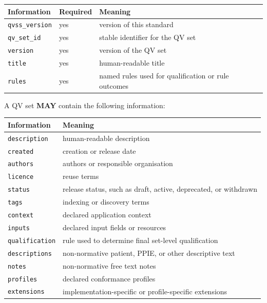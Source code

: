 \documentclass[11pt,a4paper]{article}
\begin{document}
\begin{center}
\begin{tabular}{lll}
\toprule
\textbf{Information} & \textbf{Required} & \textbf{Meaning} \\
\midrule
\texttt{qvss\_version} & yes & version of this standard \\
\texttt{qv\_set\_id} & yes & stable identifier for the QV set \\
\texttt{version} & yes & version of the QV set \\
\texttt{title} & yes & human-readable title \\
\texttt{rules} & yes & named rules used for qualification or rule outcomes \\
\bottomrule
\end{tabular}
\end{center}

A QV set \textbf{MAY} contain the following information:

\begin{center}
\begin{tabular}{ll}
\toprule
\textbf{Information} & \textbf{Meaning} \\
\midrule
\texttt{description} & human-readable description \\
\texttt{created} & creation or release date \\
\texttt{authors} & authors or responsible organisation \\
\texttt{licence} & reuse terms \\
\texttt{status} & release status, such as draft, active, deprecated, or withdrawn \\
\texttt{tags} & indexing or discovery terms \\
\texttt{context} & declared application context \\
\texttt{inputs} & declared input fields or resources \\
\texttt{qualification} & rule used to determine final set-level qualification \\
\texttt{descriptions} & non-normative patient, PPIE, or other descriptive text \\
\texttt{notes} & non-normative free text notes \\
\texttt{profiles} & declared conformance profiles \\
\texttt{extensions} & implementation-specific or profile-specific extensions \\
\bottomrule
\end{tabular}
\end{center}
\end{document}
